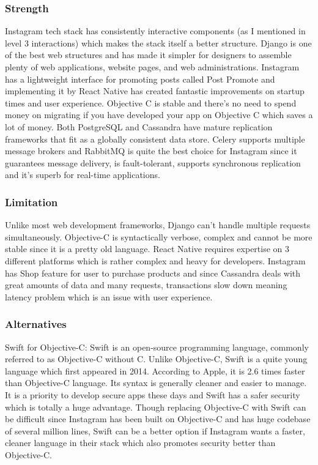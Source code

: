 \documentclass[a4paper, 11pt]{report}
\begin{document}
\subsubsection{Strength}
Instagram tech stack has consistently interactive components (as I mentioned in level 3 interactions) which makes the stack itself a better structure. Django is one of the best web structures and has made it simpler for designers to assemble plenty of web applications, website pages, and web administrations. Instagram has a lightweight interface for promoting posts called Post Promote and implementing it by React Native has created fantastic improvements on startup times and user experience\cite{ky8}. Objective C is stable and there’s no need to spend money on migrating if you have developed your app on Objective C which saves a lot of money. Both PostgreSQL and Cassandra have mature replication frameworks that fit as a globally consistent data store. Celery supports multiple message brokers and RabbitMQ is quite the best choice for Instagram since it guarantees message delivery, is fault-tolerant, supports synchronous replication and it’s superb for real-time applications\cite{ky9}.
\subsubsection{Limitation}
Unlike most web development frameworks, Django can’t handle multiple requests simultaneously. Objective-C is syntactically verbose, complex and cannot be more stable since it is a pretty old language. React Native requires expertise on 3 different platforms which is rather complex and heavy for developers. Instagram has Shop feature for user to purchase products and since Cassandra deals with great amounts of data and many requests, transactions slow down meaning latency problem which is an issue with user experience.
\subsubsection{Alternatives}
Swift for Objective-C: Swift is an open-source programming language, commonly referred to as Objective-C without C\cite{ky10}. Unlike Objective-C, Swift is a quite young language which first appeared in 2014. According to Apple, it is 2.6 times faster than Objective-C language. Its syntax is generally cleaner and easier to manage. It is a priority to develop secure apps these days and Swift has a safer security which is totally a huge advantage. Though replacing Objective-C with Swift can be difficult since Instagram has been built on Objective-C and has huge codebase of several million lines, Swift can be a better option if Instagram wants a faster, cleaner language in their stack which also promotes security better than Objective-C.
\end{document}
